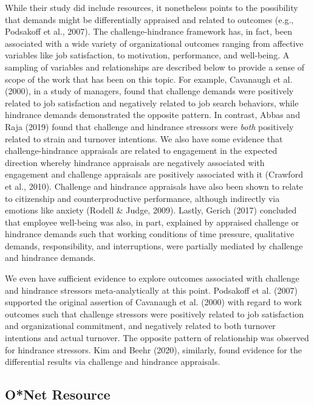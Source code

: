 \documentclass[
  english,
  man]{apa6}
\begin{document}
While their study did include resources, it nonetheless points to the possibility that demands might be differentially appraised and related to outcomes (e.g., Podsakoff et al., 2007). The challenge-hindrance framework has, in fact, been associated with a wide variety of organizational outcomes ranging from affective variables like job satisfaction, to motivation, performance, and well-being. A sampling of variables and relationships are described below to provide a sense of scope of the work that has been on this topic. For example, Cavanaugh et al. (2000), in a study of managers, found that challenge demands were positively related to job satisfaction and negatively related to job search behaviors, while hindrance demands demonstrated the opposite pattern. In contrast, Abbas and Raja (2019) found that challenge and hindrance stressors were \emph{both} positively related to strain and turnover intentions. We also have some evidence that challenge-hindrance appraisals are related to engagement in the expected direction whereby hindrance appraisals are negatively associated with engagement and challenge appraisals are positively associated with it (Crawford et al., 2010). Challenge and hindrance appraisals have also been shown to relate to citizenship and counterproductive performance, although indirectly via emotions like anxiety (Rodell \& Judge, 2009). Lastly, Gerich (2017) concluded that employee well-being was also, in part, explained by appraised challenge or hindrance demands such that working conditions of time pressure, qualitative demands, responsibility, and interruptions, were partially mediated by challenge and hindrance demands.

We even have sufficient evidence to explore outcomes associated with challenge and hindrance stressors meta-analytically at this point. Podsakoff et al. (2007) supported the original assertion of Cavanaugh et al. (2000) with regard to work outcomes such that challenge stressors were positively related to job satisfaction and organizational commitment, and negatively related to both turnover intentions and actual turnover. The opposite pattern of relationship was observed for hindrance stressors. Kim and Beehr (2020), similarly, found evidence for the differential results via challenge and hindrance appraisals.

\hypertarget{onet-resource}{%
\subsection{O*Net Resource}\label{onet-resource}}
\end{document}
